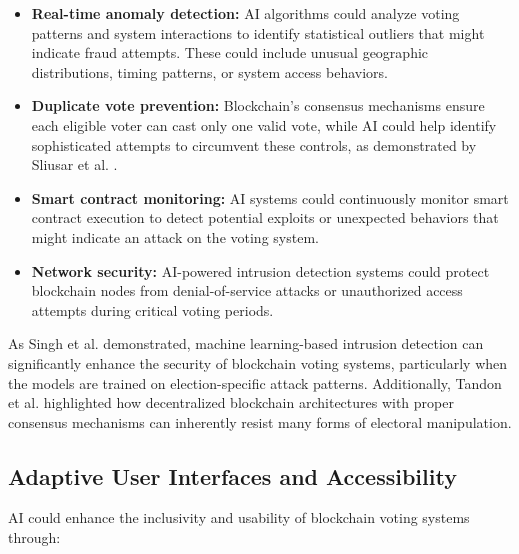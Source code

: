 \documentclass[conference]{IEEEtran}
\begin{document}
\begin{itemize}
    \item \textbf{Real-time anomaly detection:} AI algorithms could analyze voting patterns and system interactions to identify statistical outliers that might indicate fraud attempts. These could include unusual geographic distributions, timing patterns, or system access behaviors.
    
    \item \textbf{Duplicate vote prevention:} Blockchain's consensus mechanisms ensure each eligible voter can cast only one valid vote, while AI could help identify sophisticated attempts to circumvent these controls, as demonstrated by Sliusar et al. \cite{b4}.
    
    \item \textbf{Smart contract monitoring:} AI systems could continuously monitor smart contract execution to detect potential exploits or unexpected behaviors that might indicate an attack on the voting system.
    
    \item \textbf{Network security:} AI-powered intrusion detection systems could protect blockchain nodes from denial-of-service attacks or unauthorized access attempts during critical voting periods.
\end{itemize}

As Singh et al. \cite{b5} demonstrated, machine learning-based intrusion detection can significantly enhance the security of blockchain voting systems, particularly when the models are trained on election-specific attack patterns. Additionally, Tandon et al. \cite{b3} highlighted how decentralized blockchain architectures with proper consensus mechanisms can inherently resist many forms of electoral manipulation.

\subsection{Adaptive User Interfaces and Accessibility}
AI could enhance the inclusivity and usability of blockchain voting systems through:
\end{document}
